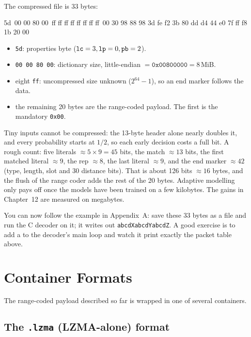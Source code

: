 \documentclass[11pt,a4paper,oneside]{book}
\newcommand{\code}[1]{\texttt{\detokenize{#1}}}
\newcommand{\hex}[1]{\texttt{0x#1}}
\begin{document}
The compressed file is 33 bytes:
\begin{center}
\small\ttfamily
5d\ 00 00 80 00\ ff ff ff ff ff ff ff ff\ 00 30 98 88 98 3d fe f2 3b 80 dd d4 44 e0 7f ff f8 1b 20 00
\end{center}
\begin{itemize}
\item \texttt{5d}: properties byte ($\code{lc}=3,\code{lp}=0,\code{pb}=2$).
\item \texttt{00 00 80 00}: dictionary size, little-endian $=\hex{00800000}=8$\,MiB.
\item eight \texttt{ff}: uncompressed size unknown ($2^{64}-1$), so an end marker follows the data.
\item the remaining 20 bytes are the range-coded payload. The first is the mandatory \hex{00}.
\end{itemize}

\begin{pitfall}
Tiny inputs cannot be compressed: the 13-byte header alone nearly doubles it, and every probability starts at $1/2$, so each early decision costs a full bit.
A rough count: five literals $\approx5\times9=45$ bits, the match $\approx13$ bits, the first matched literal $\approx9$, the rep $\approx8$, the last literal $\approx9$, and the end marker
$\approx42$ (type, length, slot and 30 distance bits). That is about 126 bits $\approx16$ bytes, and the flush of the range coder adds the rest of the 20 bytes.
Adaptive modelling only pays off once the models have been trained on a few kilobytes. The gains in Chapter~12 are measured on megabytes.
\end{pitfall}

You can now follow the example in Appendix~A: save these 33 bytes as a file and run the C decoder on it; it writes out \texttt{abcdXabcdYabcdZ}.
A good exercise is to add a \code{printf} to the decoder's main loop and watch it print exactly the packet table above.

\chapter{Container Formats}

The range-coded payload described so far is wrapped in one of several containers.

\section{The \texttt{.lzma} (LZMA-alone) format}
\end{document}
